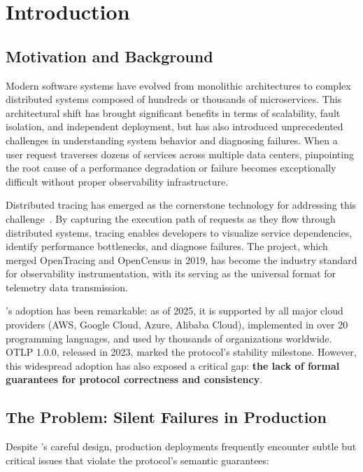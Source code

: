
\section{Introduction}
\label{sec:introduction}

\subsection{Motivation and Background}
\label{sec:motivation}

Modern software systems have evolved from monolithic architectures to complex distributed systems composed of hundreds or thousands of microservices. This architectural shift has brought significant benefits in terms of scalability, fault isolation, and independent deployment, but has also introduced unprecedented challenges in understanding system behavior and diagnosing failures. When a user request traverses dozens of services across multiple data centers, pinpointing the root cause of a performance degradation or failure becomes exceptionally difficult without proper observability infrastructure.

Distributed tracing has emerged as the cornerstone technology for addressing this challenge~\cite{sigelman2010dapper}. By capturing the execution path of requests as they flow through distributed systems, tracing enables developers to visualize service dependencies, identify performance bottlenecks, and diagnose failures. The \otel project, which merged OpenTracing and OpenCensus in 2019, has become the industry standard for observability instrumentation, with its \otlp serving as the universal format for telemetry data transmission.

\otlp's adoption has been remarkable: as of 2025, it is supported by all major cloud providers (AWS, Google Cloud, Azure, Alibaba Cloud), implemented in over 20 programming languages, and used by thousands of organizations worldwide. OTLP 1.0.0, released in 2023, marked the protocol's stability milestone. However, this widespread adoption has also exposed a critical gap: \textbf{the lack of formal guarantees for protocol correctness and consistency}.

\subsection{The Problem: Silent Failures in Production}
\label{sec:problem}

Despite \otlp's careful design, production deployments frequently encounter subtle but critical issues that violate the protocol's semantic guarantees:


